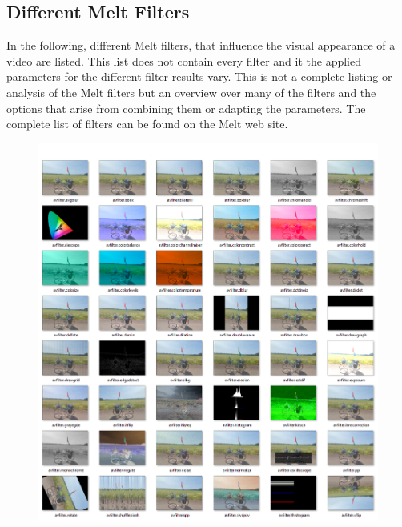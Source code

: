 \documentclass[../MasterThesis.tex]{subfiles}
\begin{document}

\newpage
\subsection{Different Melt Filters} \label{appendix:differentMeltFilter}

In the following, different Melt filters, that influence the visual appearance of a video are listed. This list does not contain every filter and it the applied parameters for the different filter results vary. This is not a complete listing or analysis of the Melt filters but an overview over many of the filters and the options that arise from combining them or adapting the parameters. The complete list of filters can be found on the Melt web site.~\cite{melt_filters}
%
\begin{figure}[H]
	\includegraphics[width=1\textwidth]{Seite1.png}
\end{figure}
\end{document}
